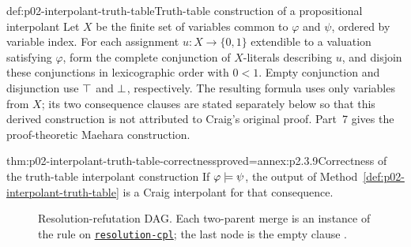 \begin{hbmethod}{def:p02-interpolant-truth-table}{Truth-table construction of a propositional interpolant}
Let \(X\) be the finite set of variables common to \(\varphi\) and \(\psi\),
ordered by variable index.
For each assignment \(u:X\to\{0,1\}\) extendible to a valuation satisfying
\(\varphi\), form the complete conjunction of \(X\)-literals describing
\(u\), and disjoin these conjunctions in lexicographic order with \(0<1\).  Empty
conjunction and disjunction use \(\top\) and \(\bot\), respectively.
The resulting formula uses only variables from \(X\); its two consequence
clauses are stated separately below so that this derived construction is not
attributed to Craig's original proof.
Part~7 gives the proof-theoretic Maehara construction.
\end{hbmethod}

\begin{hblemma}{thm:p02-interpolant-truth-table-correctness}{proved=annex:p2.3.9}{Correctness of the truth-table interpolant construction}
If \(\varphi\models\psi\), the output of
Method~\ref{def:p02-interpolant-truth-table} is a Craig interpolant for that
consequence.
\end{hblemma}

\begin{figure}[tp]
\centering
{}
\caption{Resolution-refutation DAG.  Each two-parent merge is an instance of
the rule on \hyperref[sheet:resolution-cpl]{\texttt{resolution-cpl}}; the last node is the empty clause
.}
\label{fig:p02-resolution-dag}
\end{figure}

